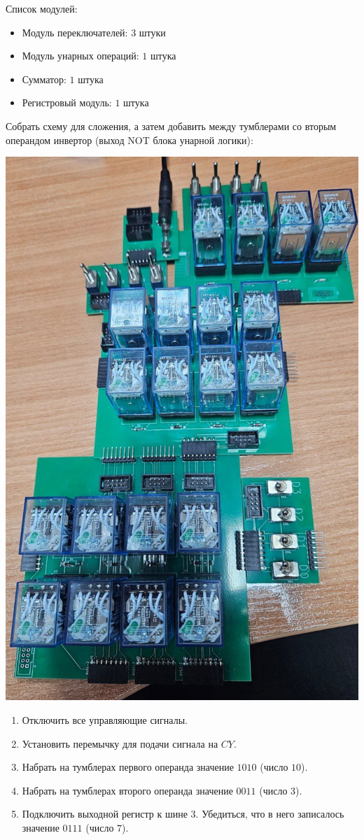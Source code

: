 Список модулей:
\begin{itemize}
    \item Модуль переключателей: $3$ штуки
    \item Модуль унарных операций: $1$ штука
    \item Сумматор: $1$ штука
    \item Регистровый модуль: $1$ штука
\end{itemize}

Собрать схему для сложения, а затем добавить между тумблерами со вторым операндом
инвертор (выход NOT блока унарной логики):

\includegraphics[width=0.5\columnwidth]{photo/subtractor.jpg}

\begin{enumerate}
    \item Отключить все управляющие сигналы.
    \item Установить перемычку для подачи сигнала на $CY$.
    \item Набрать на тумблерах первого операнда значение $1010$ (число $10$).
    \item Набрать на тумблерах второго операнда значение $0011$ (число $3$).
    \item Подключить выходной регистр к шине $3$. Убедиться, что в него записалось значение $0111$ (число $7$).
\end{enumerate}
